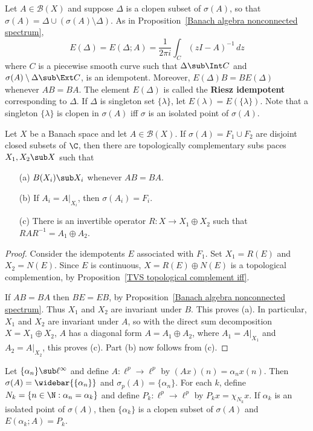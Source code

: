 Let $A\in\mathcal{B}(X)$ and suppose $\Delta$ is a clopen subset of $\sigma(A)$, so that $\sigma(A)=\Delta\cup(\sigma(A)\setminus\Delta)$. As in Proposition~\ref{Banach algebra nonconnected spectrum},
\[E(\Delta)=E(\Delta;A)=\frac{1}{2\pi i}\int_C(zI-A)^{-1}\,dz\]
where $C$ is a piecewise smooth curve such that $\Delta\sub\Int C$ and $\sigma(A)\setminus\Delta\sub\Ext C$, is an idempotent. Moreover, $E(\Delta)B=BE(\Delta)$ whenever $AB=BA$. The element $E(\Delta)$ is called the \textbf{Riesz idempotent} corresponding to $\Delta$. If $\Delta$ is singleton set $\{\lambda\}$, let $E(\lambda)=E(\{\lambda\})$. Note that a singleton $\{\lambda\}$ is clopen in $\sigma(A)$ iff $\sigma$ is an isolated point of $\sigma(A)$.
\begin{proposition}\label{Banach space operator spectrum nonconnected}
Let $X$ be a Banach space and let $A\in\mathcal{B}(X)$. If $\sigma(A)=F_1\cup F_2$ are disjoint closed subsets of $\C$, then there are topologically complementary subs paces $X_1,X_2\sub X$ such that
\begin{itemize}
\item[(a)] $B(X_i)\sub X_i$ whenever $AB=BA$.
\item[(b)] If $A_i=A|_{X_i}$, then $\sigma(A_i)=F_i$.
\item[(c)] There is an invertible operator $R:X\to X_1\oplus X_2$ such that $RAR^{-1}=A_1\oplus A_2$.
\end{itemize}
\end{proposition}
\begin{proof}
Consider the idempotents $E$ associated with $F_1$. Set $X_1=R(E)$ and $X_2=N(E)$. Since $E$ is continuous, $X=R(E)\oplus N(E)$ is a topological complemention, by Proposition~\ref{TVS topological complement iff}.\par
If $AB=BA$ then $BE=EB$, by Proposition~\ref{Banach algebra nonconnected spectrum}. Thus $X_1$ and $X_2$ are invariant under $B$. This proves (a). In particular, $X_1$ and $X_2$ are invariant under $A$, so with the direct sum decomposition $X=X_1\oplus X_2$, $A$ has a diagonal form $A=A_1\oplus A_2$, where $A_1=A|_{X_1}$ and $A_2=A|_{X_2}$, this proves (c). Part (b) now follows from (c).
\end{proof}
\begin{example}
Let $\{\alpha_n\}\sub\ell^\infty$ and define $A:\ell^p\to\ell^p$ by $(Ax)(n)=\alpha_nx(n)$. Then $\sigma(A)=\widebar{\{\alpha_n\}}$ and $\sigma_p(A)=\{\alpha_n\}$. For each $k$, define $N_k=\{n\in\N:\alpha_n=\alpha_k\}$ and define $P_k:\ell^p\to\ell^p$ by $P_kx=\chi_{N_k}x$. If $\alpha_k$ is an isolated point of $\sigma(A)$, then $\{\alpha_k\}$ is a clopen subset of $\sigma(A)$ and $E(\alpha_k;A)=P_k$.
\end{example}
